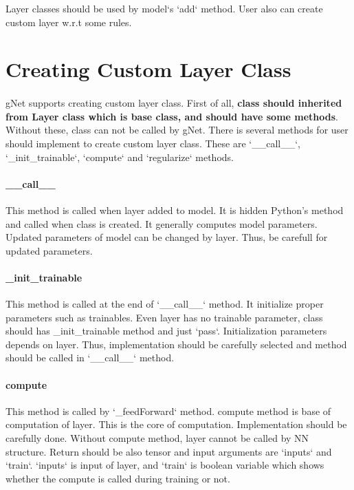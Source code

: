 \documentclass[12pt]{report}
\begin{document}
Layer classes should be used by model`s `add` method. User also can create custom layer w.r.t some rules. 



\section{Creating Custom Layer Class}

\paragraph{}
gNet supports creating custom layer class. First of all, \textbf{class should inherited from Layer class which is base class, and should have some methods}. Without these, class can not be called by gNet. There is several methods for user should implement to create custom layer class. These are `\_\_call\_\_`, `\_init\_trainable`, `compute` and `regularize` methods. 

\paragraph{\_\_call\_\_}
This method is called when layer added to model. It is hidden Python's method and called when class is created. It generally computes model parameters. Updated parameters of model can be changed by layer. Thus, be carefull
for updated parameters. 

\paragraph{\_init\_trainable}
This method is called at the end of `\_\_call\_\_` method. It initialize proper parameters such as trainables. Even layer has no trainable parameter, class should has \_init\_trainable
method and just `pass`. Initialization parameters depends on layer. Thus, implementation should be carefully selected and method should be called in `\_\_call\_\_` method.

\paragraph{compute}
This method is called by `\_feedForward` method. compute method is base of computation of layer. This is the core of 
computation. Implementation should be carefully done. Without compute method, layer cannot be called by NN structure. Return should be also tensor and input arguments are `inputs` and `train`. `inputs` is input of layer, and `train` is boolean variable which shows whether the compute is called during training or not. 
\end{document}
